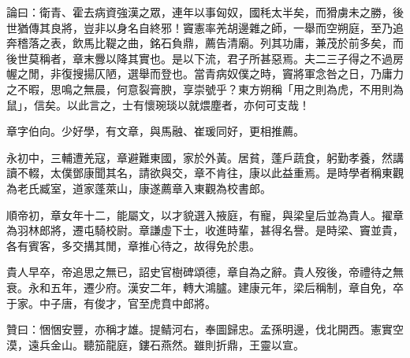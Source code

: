 \begin{pinyinscope}
論曰：衛青、霍去病資強漢之眾，連年以事匈奴，國秏太半矣，而猾虜未之勝，後世猶傳其良將，豈非以身名自終邪！竇憲率羌胡邊雜之師，一舉而空朔庭，至乃追奔稽落之表，飲馬比鞮之曲，銘石負鼎，薦告清廟。列其功庸，兼茂於前多矣，而後世莫稱者，章末釁以降其實也。是以下流，君子所甚惡焉。夫二三子得之不過房幄之閒，非復搜揚仄陋，選舉而登也。當青病奴僕之時，竇將軍念咎之日，乃庸力之不暇，思鳴之無晨，何意裂膏腴，享崇號乎？東方朔稱「用之則為虎，不用則為鼠」，信矣。以此言之，士有懷琬琰以就煨塵者，亦何可支哉！

章字伯向。少好學，有文章，與馬融、崔瑗同好，更相推薦。

永初中，三輔遭羌寇，章避難東國，家於外黃。居貧，蓬戶蔬食，躬勤孝養，然講讀不輟，太僕鄧康聞其名，請欲與交，章不肯往，康以此益重焉。是時學者稱東觀為老氏臧室，道家蓬萊山，康遂薦章入東觀為校書郎。

順帝初，章女年十二，能屬文，以才貌選入掖庭，有寵，與梁皇后並為貴人。擢章為羽林郎將，遷屯騎校尉。章謙虛下士，收進時輩，甚得名譽。是時梁、竇並貴，各有賓客，多交搆其閒，章推心待之，故得免於患。

貴人早卒，帝追思之無已，詔史官樹碑頌德，章自為之辭。貴人歿後，帝禮待之無衰。永和五年，遷少府。漢安二年，轉大鴻臚。建康元年，梁后稱制，章自免，卒于家。中子唐，有俊才，官至虎賁中郎將。

贊曰：悃悃安豐，亦稱才雄。提鲭河右，奉圖歸忠。孟孫明邊，伐北開西。憲實空漠，遠兵金山。聽笳龍庭，鏤石燕然。雖則折鼎，王靈以宣。


\end{pinyinscope}
